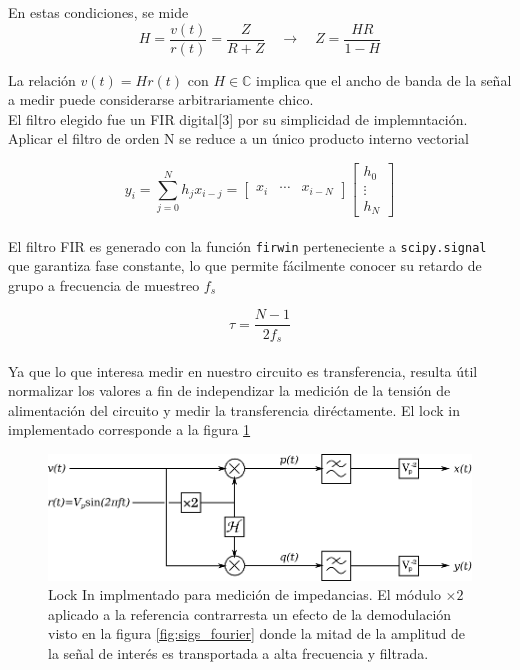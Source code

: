 \documentclass[11pt,a4paper]{extarticle}
\begin{document}
\begin{multicols}{2}
En estas condiciones, se mide 
\begin{equation}
	H = \frac{v(t)}{r(t)} = \frac{Z}{R + Z} \quad \longrightarrow \quad Z =  \frac{HR}{1-H}	
\end{equation}

La relación $v(t) = H r(t)$ con $H \in \mathbb C$ implica que el ancho de banda de la señal a medir puede considerarse arbitrariamente chico.\\

El filtro elegido fue un FIR digital[3] por su simplicidad de implemntación. Aplicar el filtro de orden N se reduce a un único producto interno vectorial

\begin{equation}\label{eq:fir}
	y_i = \sum_{j=0}^N h_jx_{i-j}= 
	\begin{bmatrix}
		x_i & \cdots & x_{i-N}
	\end{bmatrix}
	\begin{bmatrix}
		h_0 \\ \vdots \\ h_N	
	\end{bmatrix}
\end{equation}\\[-1em]

El filtro FIR es generado con la función \texttt{firwin} perteneciente a \texttt{scipy.signal} que garantiza fase constante, lo que permite fácilmente conocer su retardo de grupo a frecuencia de muestreo $f_s$

\begin{equation}\label{eq:tau}
	\tau = \frac{N-1}{2f_s}
\end{equation}\\[-1em]

Ya que lo que interesa medir en nuestro circuito es transferencia, resulta útil normalizar los valores a fin de independizar la medición de la tensión de alimentación del circuito y medir la transferencia diréctamente. El lock in implementado corresponde a la figura \ref{fig:nuestro_lockin}

\begin{figure}[H]
	\centering
	\includegraphics[width=\linewidth]{Images/nuestro_lockin.eps}
	\caption{Lock In implmentado para medición de impedancias. El módulo $\times 2$ aplicado a la referencia contrarresta un efecto de la demodulación visto en la figura \ref{fig:sigs_fourier} donde la mitad de la amplitud de la señal de interés es transportada a alta frecuencia y filtrada.}
	\label{fig:nuestro_lockin}
\end{figure}


\end{multicols}
\end{document}
